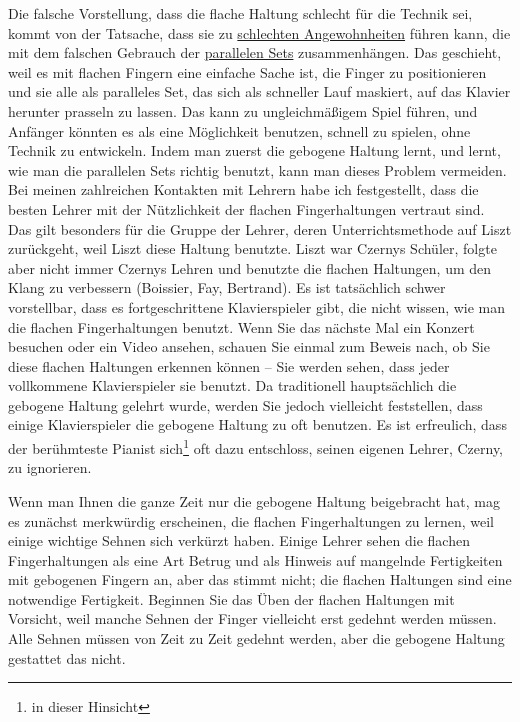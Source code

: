 Die falsche Vorstellung, dass die flache Haltung schlecht für die Technik sei, kommt von der Tatsache, dass sie zu \hyperref[c1ii22]{schlechten Angewohnheiten} führen kann, die mit dem falschen Gebrauch der \hyperref[c1ii11]{parallelen Sets} zusammenhängen.
Das geschieht, weil es mit flachen Fingern eine einfache Sache ist, die Finger zu positionieren und sie alle als paralleles Set, das sich als schneller Lauf maskiert, auf das Klavier herunter prasseln zu lassen.
Das kann zu ungleichmäßigem Spiel führen, und Anfänger könnten es als eine Möglichkeit benutzen, schnell zu spielen, ohne Technik zu entwickeln.
Indem man zuerst die gebogene Haltung lernt, und lernt, wie man die parallelen Sets richtig benutzt, kann man dieses Problem vermeiden.
Bei meinen zahlreichen Kontakten mit Lehrern habe ich festgestellt, dass die besten Lehrer mit der Nützlichkeit der flachen Fingerhaltungen vertraut sind.
Das gilt besonders für die Gruppe der Lehrer, deren Unterrichtsmethode auf Liszt zurückgeht, weil Liszt diese Haltung benutzte.
Liszt war Czernys Schüler, folgte aber nicht immer Czernys Lehren und benutzte die flachen Haltungen, um den Klang zu verbessern (Boissier, Fay, Bertrand).
Es ist tatsächlich schwer vorstellbar, dass es fortgeschrittene Klavierspieler gibt, die nicht wissen, wie man die flachen Fingerhaltungen benutzt.
Wenn Sie das nächste Mal ein Konzert besuchen oder ein Video ansehen, schauen Sie einmal zum Beweis nach, ob Sie diese flachen Haltungen erkennen können -- Sie werden sehen, dass jeder vollkommene Klavierspieler sie benutzt.
Da traditionell hauptsächlich die gebogene Haltung gelehrt wurde, werden Sie jedoch vielleicht feststellen, dass einige Klavierspieler die gebogene Haltung zu oft benutzen.
Es ist erfreulich, dass der berühmteste Pianist sich\footnote{in dieser Hinsicht} oft dazu entschloss, seinen eigenen Lehrer, Czerny, zu ignorieren.

Wenn man Ihnen die ganze Zeit nur die gebogene Haltung beigebracht hat, mag es zunächst merkwürdig erscheinen, die flachen Fingerhaltungen zu lernen, weil einige wichtige Sehnen sich verkürzt haben.
Einige Lehrer sehen die flachen Fingerhaltungen als eine Art Betrug und als Hinweis auf mangelnde Fertigkeiten mit gebogenen Fingern an, aber das stimmt nicht; die flachen Haltungen sind eine notwendige Fertigkeit.
Beginnen Sie das Üben der flachen Haltungen mit Vorsicht, weil manche Sehnen der Finger vielleicht erst gedehnt werden müssen.
Alle Sehnen müssen von Zeit zu Zeit gedehnt werden, aber die gebogene Haltung gestattet das nicht.

